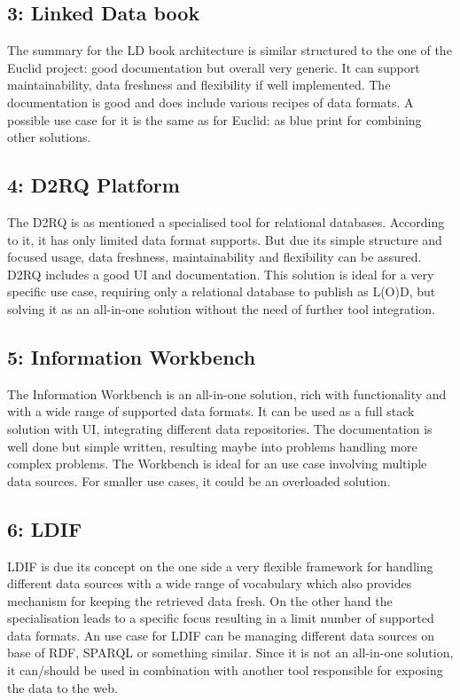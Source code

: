 \subsection*{3: Linked Data book}
The summary for the LD book architecture is similar structured to the one of the Euclid project: good documentation but overall very generic. It can support maintainability, data freshness and flexibility if well implemented. The documentation is good and does include various recipes of data formats.
A possible use case for it is the same as for Euclid: as blue print for combining other solutions.

\subsection*{4: D2RQ Platform}
The D2RQ is as mentioned a specialised tool for relational databases. According to it, it has only limited data format supports. But due its simple structure and focused usage, data freshness, maintainability and flexibility can be assured. D2RQ includes a good UI and documentation.
This solution is ideal for a very specific use case, requiring only a relational database to publish as L(O)D, but solving it as an all-in-one solution without the need of further tool integration.

\subsection*{5: Information Workbench}
The Information Workbench is an all-in-one solution, rich with functionality and with a wide range of supported data formats. It can be used as a full stack solution with UI, integrating different data repositories. The documentation is well done but simple written, resulting maybe into problems handling more complex problems.
The Workbench is ideal for an use case involving multiple data sources. For smaller use cases, it could be an overloaded solution.

\subsection*{6: LDIF}
LDIF is due its concept on the one side a very flexible framework for handling different data sources with a wide range of vocabulary which also provides mechanism for keeping the retrieved data fresh. On the other hand the specialisation leads to a specific focus resulting in a limit number of supported data formats.
An use case for LDIF can be managing different data sources on base of RDF, SPARQL or something similar. Since it is not an all-in-one solution, it can/should be used in combination with another tool responsible for exposing the data to the web.

